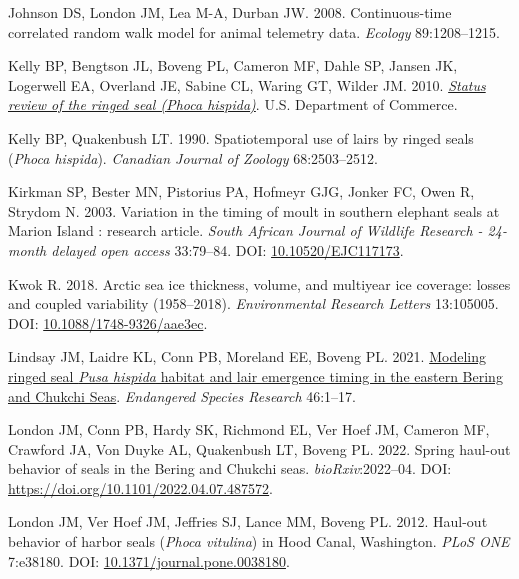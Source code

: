 \documentclass[fleqn,10pt,lineno]{wlpeerj} %
\newlength{\cslhangindent}
\newenvironment{CSLReferences}[2] %
 {\begin{list}{}{%
  \setlength{\itemindent}{0pt}
  \setlength{\leftmargin}{0pt}
  \setlength{\parsep}{0pt}
  \ifodd #1
   \setlength{\leftmargin}{\cslhangindent}
   \setlength{\itemindent}{-1\cslhangindent}
  \fi
  \setlength{\itemsep}{#2\baselineskip}}}
 {\end{list}}
\begin{document}
\begin{CSLReferences}{1}{0}
Johnson DS, London JM, Lea M-A, Durban JW. 2008. Continuous-time correlated random walk model for animal telemetry data. \emph{Ecology} 89:1208--1215.

Kelly BP, Bengtson JL, Boveng PL, Cameron MF, Dahle SP, Jansen JK, Logerwell EA, Overland JE, Sabine CL, Waring GT, Wilder JM. 2010. \emph{\href{https://repository.library.noaa.gov/view/noaa/3762}{Status review of the ringed seal (\emph{Phoca hispida})}}. U.S. Department of Commerce.

Kelly BP, Quakenbush LT. 1990. Spatiotemporal use of lairs by ringed seals (\emph{Phoca hispida}). \emph{Canadian Journal of Zoology} 68:2503--2512.

Kirkman SP, Bester MN, Pistorius PA, Hofmeyr GJG, Jonker FC, Owen R, Strydom N. 2003. Variation in the timing of moult in southern elephant seals at Marion Island : research article. \emph{South African Journal of Wildlife Research - 24-month delayed open access} 33:79--84. DOI: \href{https://doi.org/10.10520/EJC117173}{10.10520/EJC117173}.

Kwok R. 2018. Arctic sea ice thickness, volume, and multiyear ice coverage: losses and coupled variability (1958--2018). \emph{Environmental Research Letters} 13:105005. DOI: \href{https://doi.org/10.1088/1748-9326/aae3ec}{10.1088/1748-9326/aae3ec}.

Lindsay JM, Laidre KL, Conn PB, Moreland EE, Boveng PL. 2021. \href{https://www.int-res.com/abstracts/esr/v46/p1-17/}{Modeling ringed seal \emph{Pusa hispida} habitat and lair emergence timing in the eastern Bering and Chukchi Seas}. \emph{Endangered Species Research} 46:1--17.

London JM, Conn PB, Hardy SK, Richmond EL, Ver Hoef JM, Cameron MF, Crawford JA, Von Duyke AL, Quakenbush LT, Boveng PL. 2022. Spring haul-out behavior of seals in the Bering and Chukchi seas. \emph{bioRxiv}:2022--04. DOI: \url{https://doi.org/10.1101/2022.04.07.487572}.

London JM, Ver Hoef JM, Jeffries SJ, Lance MM, Boveng PL. 2012. Haul-out behavior of harbor seals (\emph{Phoca vitulina}) in Hood Canal, Washington. \emph{PLoS ONE} 7:e38180. DOI: \href{https://doi.org/10.1371/journal.pone.0038180}{10.1371/journal.pone.0038180}.


\end{CSLReferences}
\end{document}
